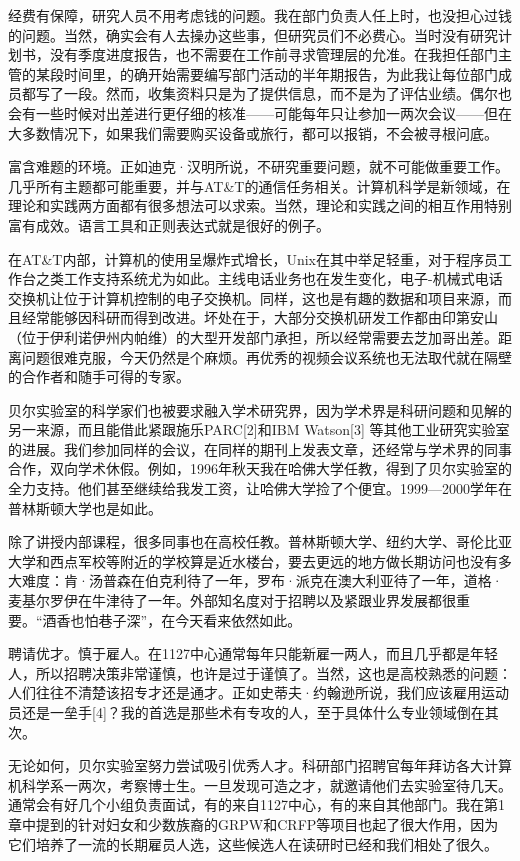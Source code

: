 \documentclass[a4paper,12pt,UTF8,twoside]{ctexbook}
\begin{document}
{{经费有保障，研究人员不用考虑钱的问题。我在部门负责人任上时，也没担心过钱的问题。当然，确实会有人去操办这些事，但研究员们不必费心。当时没有研究计划书，没有季度进度报告，也不需要在工作前寻求管理层的允准。在我担任部门主管的某段时间里，的确开始需要编写部门活动的半年期报告，为此我让每位部门成员都写了一段。然而，收集资料只是为了提供信息，而不是为了评估业绩。偶尔也会有一些时候对出差进行更仔细的核准——可能每年只让参加一两次会议——但在大多数情况下，如果我们需要购买设备或旅行，都可以报销，不会被寻根问底。

富含难题的环境。正如迪克·汉明所说，不研究重要问题，就不可能做重要工作。几乎所有主题都可能重要，并与AT\&T的通信任务相关。计算机科学是新领域，在理论和实践两方面都有很多想法可以求索。当然，理论和实践之间的相互作用特别富有成效。语言工具和正则表达式就是很好的例子。

在AT\&T内部，计算机的使用呈爆炸式增长，Unix在其中举足轻重，对于程序员工作台之类工作支持系统尤为如此。主线电话业务也在发生变化，电子-机械式电话交换机让位于计算机控制的电子交换机。同样，这也是有趣的数据和项目来源，而且经常能够因科研而得到改进。坏处在于，大部分交换机研发工作都由印第安山（位于伊利诺伊州内帕维）的大型开发部门承担，所以经常需要去芝加哥出差。距离问题很难克服，今天仍然是个麻烦。再优秀的视频会议系统也无法取代就在隔壁的合作者和随手可得的专家。

贝尔实验室的科学家们也被要求融入学术研究界，因为学术界是科研问题和见解的另一来源，而且能借此紧跟施乐PARC[2]和IBM Watson[3] 等其他工业研究实验室的进展。我们参加同样的会议，在同样的期刊上发表文章，还经常与学术界的同事合作，双向学术休假。例如，1996年秋天我在哈佛大学任教，得到了贝尔实验室的全力支持。他们甚至继续给我发工资，让哈佛大学捡了个便宜。1999—2000学年在普林斯顿大学也是如此。

除了讲授内部课程，很多同事也在高校任教。普林斯顿大学、纽约大学、哥伦比亚大学和西点军校等附近的学校算是近水楼台，要去更远的地方做长期访问也没有多大难度：肯·汤普森在伯克利待了一年，罗布·派克在澳大利亚待了一年，道格·麦基尔罗伊在牛津待了一年。外部知名度对于招聘以及紧跟业界发展都很重要。“酒香也怕巷子深”，在今天看来依然如此。

聘请优才。慎于雇人。在1127中心通常每年只能新雇一两人，而且几乎都是年轻人，所以招聘决策非常谨慎，也许是过于谨慎了。当然，这也是高校熟悉的问题：人们往往不清楚该招专才还是通才。正如史蒂夫·约翰逊所说，我们应该雇用运动员还是一垒手[4]？我的首选是那些术有专攻的人，至于具体什么专业领域倒在其次。

无论如何，贝尔实验室努力尝试吸引优秀人才。科研部门招聘官每年拜访各大计算机科学系一两次，考察博士生。一旦发现可造之才，就邀请他们去实验室待几天。通常会有好几个小组负责面试，有的来自1127中心，有的来自其他部门。我在第1章中提到的针对妇女和少数族裔的GRPW和CRFP等项目也起了很大作用，因为它们培养了一流的长期雇员人选，这些候选人在读研时已经和我们相处了很久。

}}
\end{document}
